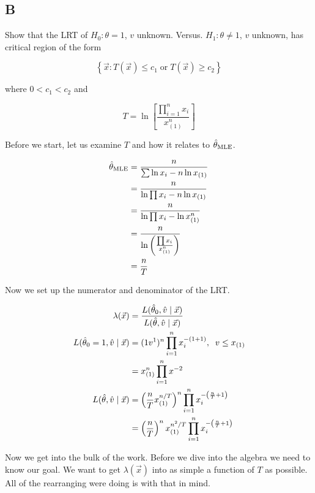 \subsection{B}

Show that the LRT of $H_0: \theta = 1$, $v$ unknown. Versus. $H_1: \theta \neq 1$, $v$ unknown, has critical region of the form

\[
	\left\{ \vec{x}: T(\vec{x}) \leq c_1 \; \text{or} \; T(\vec{x}) \geq c_2 \right\}
\]


where $0 < c_1 < c_2$ and

\[
	T = \ln\left[ \frac{\prod_{i=1}^n x_i}{x_{(1)}^n} \right]
\]

Before we start, let us examine $T$ and how it relates to $\hat{\theta}_{\text{MLE}}$.

\begin{align*}
	\hat{\theta}_{\text{MLE}} &= \frac{n}{\sum \ln x_i - n\ln x_{(1)}} \\
	&= \frac{n}{\ln \prod x_i - n\ln x_{(1)}} \\
	&= \frac{n}{\ln \prod x_i - \ln x_{(1)}^n} \\
	&= \frac{n}{\ln\left( \frac{\prod x_i}{x_{(1)}^n} \right)} \\
	&= \frac{n}{T}
\end{align*}

Now we set up the numerator and denominator of the LRT.

\begin{align*}
	\lambda(\vec{x}) &= \frac{L(\hat{\theta}_0, \hat{v} \mid \vec{x})}{L(\hat{\theta}, \hat{v} \mid \vec{x})} \\
	L(\hat{\theta}_0 = 1, \hat{v} \mid \vec{x}) &= (1v^1)^n \prod_{i=1}^n x_i^{-(1+1)}, \;\; v \leq x_{(1)} \\
	&= x_{(1)}^n \prod_{i=1}^n x^{-2} \\
	L(\hat{\theta}, \hat{v} \mid \vec{x}) &= \left( \frac{n}{T} x_{(1)}^{n/T} \right)^n \prod_{i=1}^n x_i^{-\left( \frac{n}{T} + 1 \right)} \\
	&= \left( \frac{n}{T} \right)^n x_{(1)}^{n^2/T} \prod_{i=1}^n x_i^{-\left( \frac{n}{T} + 1 \right)} 
\end{align*}

Now we get into the bulk of the work. Before we dive into the algebra we need to know our goal. We want to get $\lambda(\vec{x})$ into as simple a function of $T$ as possible. All of the rearranging were doing is with that in mind.

